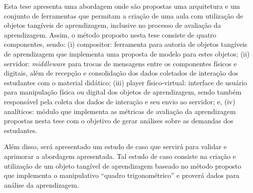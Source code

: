 
Esta tese apresenta uma abordagem
onde são propostas uma arquitetura e um conjunto de ferramentas que permitam a criação de uma aula com utilização de objetos tangíveis de aprendizagem, inclusive no processo de avaliação da aprendizagem. Assim, o método proposto nesta tese consiste de quatro componentes, sendo: (i) compositor: ferramenta para autoria de objetos tangíveis de aprendizagem que implementa uma proposta de modelo para estes objetos; (ii) servidor: \textit{middleware} para trocas de mensagens entre os componentes físicos e digitais, além de recepção e consolidação dos dados coletados de interação dos estudantes com o material didático; (iii) player físico-virtual: interface de usuário para manipulação física ou digital dos objetos de aprendizagem, sendo também responsável pela coleta dos dados de interação e seu envio ao servidor; e, (iv) analíticos: módulo que implementa as métricas de avaliação da aprendizagem propostas nesta tese com o objetivo de gerar análises sobre as demandas dos estudantes.

Além disso, será apresentado um estudo de caso que servirá para validar e aprimorar a abordagem apresentada. Tal estudo de caso consiste na criação e utilização de um objeto tangível de aprendizagem baseado no método proposto que implementa o manipulativo ``quadro trigonométrico'' e proverá dados para análise da aprendizagem.

